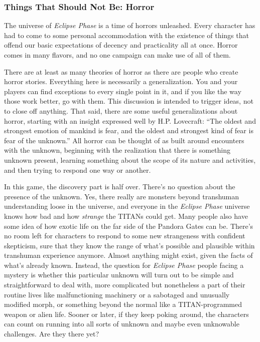 \subsubsection{Things That Should Not Be: Horror } 

The universe of \textit{Eclipse Phase} is a time of horrors unleashed. Every character has had to come to some personal accommodation with the existence of things that offend our basic expectations of decency and practicality all at once. Horror comes in many flavors, and no one campaign can make use of all of them. 

There are at least as many theories of horror as there are people who create horror stories. Everything here is necessarily a generalization. You and your players can find exceptions to every single point in it, and if you like the way those work better, go with them. This discussion is intended to trigger ideas, not to close off anything. That said, there are some useful generalizations about horror, starting with an insight expressed well by H.P. Lovecraft: ``The oldest and strongest emotion of mankind is fear, and the oldest and strongest kind of fear is fear of the unknown.'' All horror can be thought of as built around encounters with the unknown, beginning with the realization that there is something unknown present, learning something about the scope of its nature and activities, and then trying to respond one way or another. 

In this game, the discovery part is half over. There's no question about the presence of the unknown. Yes, there really are monsters beyond transhuman understanding loose in the universe, and everyone in the \textit{Eclipse Phase} universe knows how bad and how \textit{strange }the TITANs could get. Many people also have some idea of how exotic life on the far side of the Pandora Gates can be. There's no room left for characters to respond to some new strangeness with confident skepticism, sure that they know the range of what's possible and plausible within transhuman experience anymore. Almost anything might exist, given the facts of what's already known. Instead, the question for \textit{Eclipse Phase }people facing a mystery is whether this particular unknown will turn out to be simple and straightforward to deal with, more complicated but nonetheless a part of their routine lives like malfunctioning machinery or a sabotaged and unusually modified morph, or something beyond the normal like a TITAN-programmed weapon or alien life. Sooner or later, if they keep poking around, the characters can count on running into all sorts of unknown and maybe even unknowable challenges. Are they there yet? 

